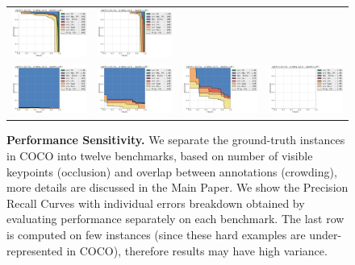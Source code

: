\documentclass[10pt,onecolumn,letterpaper]{article}
\begin{document}
\begin{figure}[h!]
{\begin{tabular}{cccc}
\includegraphics[width=.22\linewidth]{./result/rmpe/benchmarks_sensitivity/occlusion_crowding/error_prc_[1-2][75][all][20].pdf} &
\includegraphics[width=.22\linewidth]{./result/rmpe/benchmarks_sensitivity/occlusion_crowding/error_prc_[1-3][75][all][20].pdf}\\
\includegraphics[width=.22\linewidth]{./result/rmpe/benchmarks_sensitivity/occlusion_crowding/error_prc_[2-0][75][all][20].pdf} &
\includegraphics[width=.22\linewidth]{./result/rmpe/benchmarks_sensitivity/occlusion_crowding/error_prc_[2-1][75][all][20].pdf} &
\includegraphics[width=.22\linewidth]{./result/rmpe/benchmarks_sensitivity/occlusion_crowding/error_prc_[2-2][75][all][20].pdf} &
\includegraphics[width=.22\linewidth]{./result/rmpe/benchmarks_sensitivity/occlusion_crowding/error_prc_[2-3][75][all][20].pdf}\\
\end{tabular}
}
\caption{ {\small \textbf{Performance Sensitivity.} We separate the ground-truth instances in COCO into twelve benchmarks, based on number of visible keypoints (occlusion)
and overlap between annotations (crowding), more details are discussed in the Main Paper. We show the Precision Recall Curves with individual errors breakdown
obtained by evaluating performance separately on each benchmark. The last row is computed on few instances (since these hard examples are under-represented in COCO),
therefore results may have high variance.}}
\end{figure}
\end{document}
